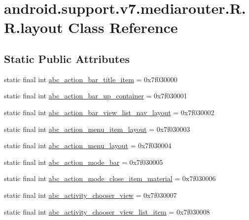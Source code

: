 \hypertarget{classandroid_1_1support_1_1v7_1_1mediarouter_1_1_r_1_1layout}{
\section{android.support.v7.mediarouter.R.R.layout Class Reference}
\label{classandroid_1_1support_1_1v7_1_1mediarouter_1_1_r_1_1layout}
}
\subsection*{Static Public Attributes}
\begin{CompactItemize}
\item 
static final int \hyperlink{classandroid_1_1support_1_1v7_1_1mediarouter_1_1_r_1_1layout_c4b1d6ab82b700766f25bb4ebd24ca8b}{abc\_\-action\_\-bar\_\-title\_\-item} = 0x7f030000
\item 
static final int \hyperlink{classandroid_1_1support_1_1v7_1_1mediarouter_1_1_r_1_1layout_51945febe6b33c106317a600464bbd90}{abc\_\-action\_\-bar\_\-up\_\-container} = 0x7f030001
\item 
static final int \hyperlink{classandroid_1_1support_1_1v7_1_1mediarouter_1_1_r_1_1layout_470ccac9dd70e6018813d83652b6bb74}{abc\_\-action\_\-bar\_\-view\_\-list\_\-nav\_\-layout} = 0x7f030002
\item 
static final int \hyperlink{classandroid_1_1support_1_1v7_1_1mediarouter_1_1_r_1_1layout_494a1ece566d16a180617301f3b807d8}{abc\_\-action\_\-menu\_\-item\_\-layout} = 0x7f030003
\item 
static final int \hyperlink{classandroid_1_1support_1_1v7_1_1mediarouter_1_1_r_1_1layout_cc498735b7266101e70aaf7175de1802}{abc\_\-action\_\-menu\_\-layout} = 0x7f030004
\item 
static final int \hyperlink{classandroid_1_1support_1_1v7_1_1mediarouter_1_1_r_1_1layout_f538467d314a3684948d1f0a615924c0}{abc\_\-action\_\-mode\_\-bar} = 0x7f030005
\item 
static final int \hyperlink{classandroid_1_1support_1_1v7_1_1mediarouter_1_1_r_1_1layout_df0a23f3cd67777a8664ac2a0502c4e8}{abc\_\-action\_\-mode\_\-close\_\-item\_\-material} = 0x7f030006
\item 
static final int \hyperlink{classandroid_1_1support_1_1v7_1_1mediarouter_1_1_r_1_1layout_5bc64d552124e82186f8f0633bacae12}{abc\_\-activity\_\-chooser\_\-view} = 0x7f030007
\item 
static final int \hyperlink{classandroid_1_1support_1_1v7_1_1mediarouter_1_1_r_1_1layout_43687b76ceed20bf465d93332c63c538}{abc\_\-activity\_\-chooser\_\-view\_\-list\_\-item} = 0x7f030008

\end{CompactItemize}
